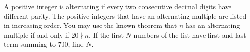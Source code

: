A positive integer is alternating if every two consecutive decimal digits have different parity. The positive integers that have an alternating multiple are listed in increasing order. You may use the known theorem that $n$ has an alternating multiple if and only if $20\nmid n$. If the first $N$ numbers of the list have first and last term summing to $700$, find $N$.
